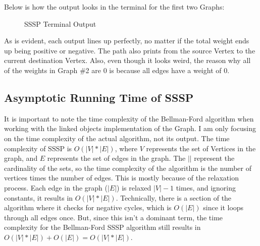 \documentclass[letterpaper, 10pt]{article}
\begin{document}
\vspace{1em}
\noindent
Below is how the output looks in the terminal for the first two Graphs:
\begin{figure}[H] 
    \centering 
    \caption{SSSP Terminal Output}
    \label{fig:figure2.16}
\end{figure}

\noindent
As is evident, each output lines up perfectly, no matter if the total weight ends up being positive or negative. The path also prints from the source Vertex to the current destination Vertex. Also, even though it looks weird, the reason why all of the weights in Graph \#2 are 0 is because all edges have a weight of 0. 

\subsection{Asymptotic Running Time of SSSP}

\noindent
It is important to note the time complexity of the Bellman-Ford algorithm when working with the linked objects implementation of the Graph. I am only focusing on the time complexity of the actual algorithm, not its output. The time complexity of SSSP is $O(|V| * |E|)$, where $V$ represents the set of Vertices in the graph, and $E$ represents the set of edges in the graph. The $||$ represent the cardinality of the sets, so the time complexity of the algorithm is the number of vertices times the number of edges. This is mostly because of the relaxation process. Each edge in the graph ($|E|$) is relaxed $|V| - 1$ times, and ignoring constants, it results in $O(|V| * |E|)$. Technically, there is a section of the algorithm where it checks for negative cycles, which is $O(|E|)$ since it loops through all edges once. But, since this isn't a dominant term, the time complexity for the Bellman-Ford SSSP algorithm still results in $O(|V| * |E|) + O(|E|) = O(|V| * |E|)$.
\end{document}
